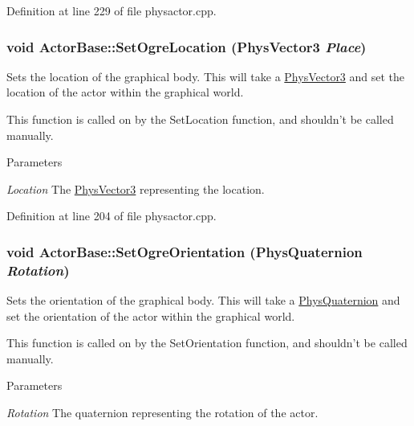 Definition at line 229 of file physactor.cpp.\hypertarget{classActorBase_a3140cc5c1c630efc1c04c20ada319b8b}{
\subsubsection[{SetOgreLocation}]{\setlength{\rightskip}{0pt plus 5cm}void ActorBase::SetOgreLocation ({\bf PhysVector3} {\em Place})}}
\label{dd/d7b/classActorBase_a3140cc5c1c630efc1c04c20ada319b8b}


Sets the location of the graphical body. This will take a \hyperlink{classPhysVector3}{PhysVector3} and set the location of the actor within the graphical world. \par
 This function is called on by the SetLocation function, and shouldn't be called manually. 
\begin{DoxyParams}{Parameters}
\item[{\em Location}]The \hyperlink{classPhysVector3}{PhysVector3} representing the location. \end{DoxyParams}


Definition at line 204 of file physactor.cpp.\hypertarget{classActorBase_a55f45703e3d9b8de0cd07b23bd9460bf}{
\subsubsection[{SetOgreOrientation}]{\setlength{\rightskip}{0pt plus 5cm}void ActorBase::SetOgreOrientation ({\bf PhysQuaternion} {\em Rotation})}}
\label{dd/d7b/classActorBase_a55f45703e3d9b8de0cd07b23bd9460bf}


Sets the orientation of the graphical body. This will take a \hyperlink{classPhysQuaternion}{PhysQuaternion} and set the orientation of the actor within the graphical world. \par
 This function is called on by the SetOrientation function, and shouldn't be called manually. 
\begin{DoxyParams}{Parameters}
\item[{\em Rotation}]The quaternion representing the rotation of the actor. \end{DoxyParams}


